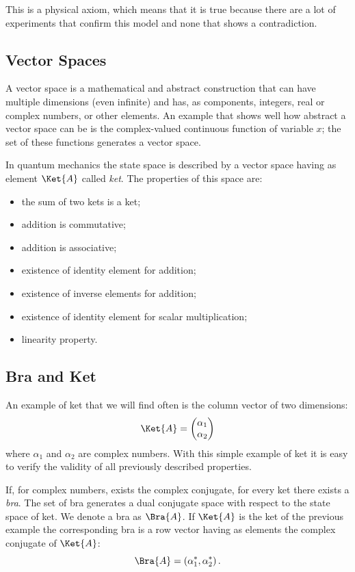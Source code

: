This is a physical axiom, which means that it is true because there are a lot of experiments that confirm this model and none that shows a contradiction.

\subsection{Vector Spaces}
A vector space is a mathematical and abstract construction that can have multiple dimensions (even infinite) and has, as components, integers, real or complex numbers, or other elements. An example that shows well how abstract a vector space can be is the complex-valued continuous function of variable $x$; the set of these functions generates a vector space.

In quantum mechanics the state space is described by a vector space having as element $\Ket{A}$ called \emph{ket}. The properties of this space are:

\begin{itemize}
	\item the sum of two kets is a ket;
	\item addition is commutative;
	\item addition is associative;
	\item existence of identity element for addition;
	\item existence of inverse elements for addition;
	\item existence of identity element for scalar multiplication;
	\item linearity property.
\end{itemize}

\subsection{Bra and Ket}
An example of ket that we will find often is the column vector of two dimensions:
\[
\Ket{A} = 
\begin{pmatrix}
	\alpha_1 \\
	\alpha_2
\end{pmatrix}
\]
where $\alpha_1$ and $\alpha_2$ are complex numbers. With this simple example of ket it is easy to verify the validity of all previously described properties.

If, for complex numbers, exists the complex conjugate, for every ket there exists a \emph{bra}. The set of bra generates a dual conjugate space with respect to the state space of ket. We denote a bra as $\Bra{A}$. If $\Ket{A}$ is the ket of the previous example the corresponding bra is a row vector having as elements the complex conjugate of $\Ket{A}$:
\[
\Bra{A}= \left(\alpha_1^*, \alpha_2^*\right).
\]


